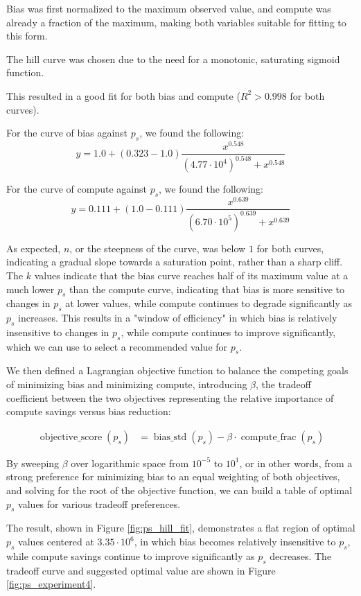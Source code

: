 Bias was first normalized to the maximum observed value, and compute was already a fraction of the maximum, making both variables suitable for fitting to this form. 

The hill curve was chosen due to the need for a monotonic, saturating sigmoid function.

This resulted in a good fit for both bias and compute ($R^2 > 0.998$ for both curves).

For the curve of bias against $p_s$, we found the following:
\[
    y = 1.0 + (0.323 - 1.0) \frac{x^0.548}{(4.77 \cdot 10^4)^0.548 + x^0.548}
\]

For the curve of compute against $p_s$, we found the following:
\[
    y = 0.111 + (1.0 - 0.111) \frac{x^{0.639}}{(6.70 \cdot 10^5)^{0.639} + x^{0.639}}
\]

As expected, $n$, or the steepness of the curve, was below $1$ for both curves, indicating a gradual slope towards a saturation point, rather than a sharp cliff. The $k$ values indicate that the bias curve reaches half of its maximum value at a much lower $p_s$ than the compute curve, indicating that bias is more sensitive to changes in $p_s$ at lower values, while compute continues to degrade significantly as $p_s$ increases. This results in a "window of efficiency" in which bias is relatively insensitive to changes in $p_s$, while compute continues to improve significantly, which we can use to select a recommended value for $p_s$.


We then defined a Lagrangian objective function \cite{Everett1963} to balance the competing goals of minimizing bias and minimizing compute, introducing $\beta$, the tradeoff coefficient between the two objectives representing the relative importance of compute savings versus bias reduction:

\begin{align}
    \operatorname{objective\_score}(p_s)
    &= \operatorname{bias\_std}(p_s)
     - \beta \cdot \operatorname{compute\_frac}(p_s)
\end{align}

By sweeping $\beta$ over logarithmic space from $10^{-5}$ to $10^1$, or in other words, from a strong preference for minimizing bias to an equal weighting of both objectives, and solving for the root of the objective function, we can build a table of optimal $p_s$ values for various tradeoff preferences.

The result, shown in Figure \ref{fig:ps_hill_fit}, demonstrates a flat region of optimal $p_s$ values centered at $3.35 \cdot 10^{6}$, in which bias becomes relatively insensitive to $p_s$, while compute savings continue to improve significantly as $p_s$ decreases. The tradeoff curve and suggested optimal value are shown in Figure \ref{fig:ps_experiment4}.

